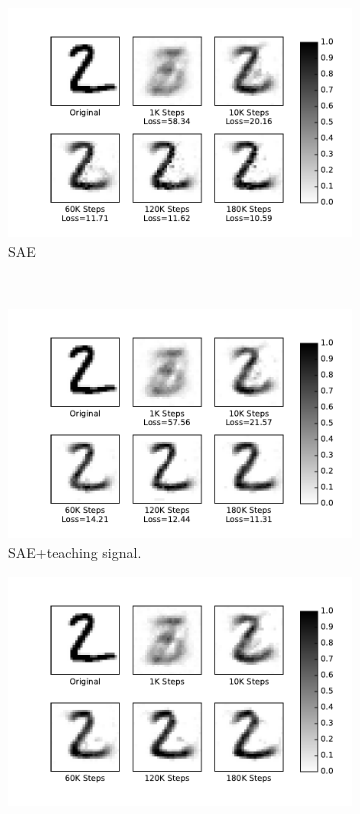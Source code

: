 \begin{figure}
\begin{subfigure}[t]{0.32\textwidth}
		\includegraphics[width=\textwidth]{pics_sdlm/40_MNIST_SAE_original/recon_digit.pdf}
		\caption{SAE}
	\end{subfigure}\\
	\begin{subfigure}[t]{0.32\textwidth}
		\includegraphics[width=\textwidth]{pics_sdlm/41_MNIST_SAE_teach/recon_digit.pdf}
		\caption{SAE+teaching signal.}
	\end{subfigure}
	\begin{subfigure}[t]{0.32\textwidth}
		\includegraphics[width=\textwidth]{pics_sdlm/noise_ae/recon_digit.pdf}

\end{subfigure}
\end{figure}
